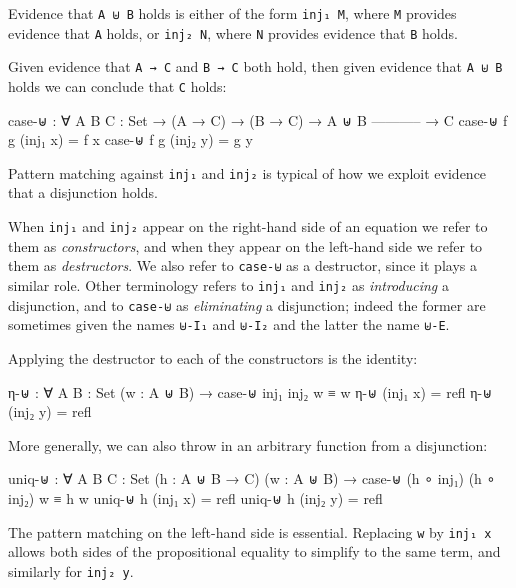 Evidence that \texttt{A\ ⊎\ B} holds is either of the form
\texttt{inj₁\ M}, where \texttt{M} provides evidence that \texttt{A}
holds, or \texttt{inj₂\ N}, where \texttt{N} provides evidence that
\texttt{B} holds.

Given evidence that \texttt{A\ →\ C} and \texttt{B\ →\ C} both hold,
then given evidence that \texttt{A\ ⊎\ B} holds we can conclude that
\texttt{C} holds:

\begin{fence}
\begin{code}
case-⊎ : ∀ {A B C : Set}
  → (A → C)
  → (B → C)
  → A ⊎ B
    -----------
  → C
case-⊎ f g (inj₁ x) = f x
case-⊎ f g (inj₂ y) = g y
\end{code}
\end{fence}

Pattern matching against \texttt{inj₁} and \texttt{inj₂} is typical of
how we exploit evidence that a disjunction holds.

When \texttt{inj₁} and \texttt{inj₂} appear on the right-hand side of an
equation we refer to them as \emph{constructors}, and when they appear
on the left-hand side we refer to them as \emph{destructors}. We also
refer to \texttt{case-⊎} as a destructor, since it plays a similar role.
Other terminology refers to \texttt{inj₁} and \texttt{inj₂} as
\emph{introducing} a disjunction, and to \texttt{case-⊎} as
\emph{eliminating} a disjunction; indeed the former are sometimes given
the names \texttt{⊎-I₁} and \texttt{⊎-I₂} and the latter the name
\texttt{⊎-E}.

Applying the destructor to each of the constructors is the identity:

\begin{fence}
\begin{code}
η-⊎ : ∀ {A B : Set} (w : A ⊎ B) → case-⊎ inj₁ inj₂ w ≡ w
η-⊎ (inj₁ x) = refl
η-⊎ (inj₂ y) = refl
\end{code}
\end{fence}

More generally, we can also throw in an arbitrary function from a
disjunction:

\begin{fence}
\begin{code}
uniq-⊎ : ∀ {A B C : Set} (h : A ⊎ B → C) (w : A ⊎ B) →
  case-⊎ (h ∘ inj₁) (h ∘ inj₂) w ≡ h w
uniq-⊎ h (inj₁ x) = refl
uniq-⊎ h (inj₂ y) = refl
\end{code}
\end{fence}

The pattern matching on the left-hand side is essential. Replacing
\texttt{w} by \texttt{inj₁\ x} allows both sides of the propositional
equality to simplify to the same term, and similarly for
\texttt{inj₂\ y}.

